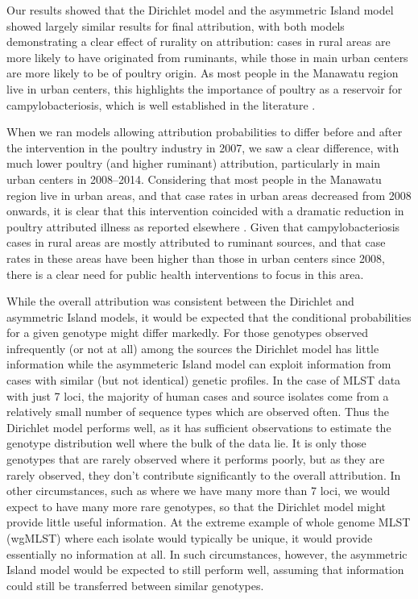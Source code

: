 \documentclass[AMA,STIX1COL]{WileyNJD-v2}
\begin{document}
Our results showed that the Dirichlet model and the asymmetric Island model showed largely similar results for final attribution, with both models demonstrating a clear effect of rurality on attribution: cases in rural areas are more likely to have originated from ruminants, while those in main urban centers are more likely to be of poultry origin. As most people in the Manawatu region live in urban centers, this highlights the importance of poultry as a reservoir for campylobacteriosis, which is well established in the literature \cite{MullA, Marsh, MullM, Leve}.

When we ran models allowing attribution probabilities to differ before and after the intervention in the poultry industry in 2007, we saw a clear difference, with much lower poultry (and higher ruminant) attribution, particularly in main urban centers in 2008--2014. Considering that most people in the Manawatu region live in urban areas, and that case rates in urban areas decreased from 2008 onwards, it is clear that this intervention coincided with a dramatic reduction in poultry attributed illness as reported elsewhere \cite{AnnS}. Given that campylobacteriosis cases in rural areas are mostly attributed to ruminant sources, and that case rates in these areas have been higher than those in urban centers since 2008, there is a clear need for public health interventions to focus in this area.

While the overall attribution was consistent between the Dirichlet and asymmetric Island models, it would be expected that the conditional probabilities for a given genotype might differ markedly. For those genotypes observed infrequently (or not at all) among the sources the Dirichlet model has little information while the asymmeteric Island model can exploit information from cases with similar (but not identical) genetic profiles. In the case of MLST data with just 7 loci, the majority of human cases and source isolates come from a relatively small number of sequence types which are observed often. Thus the Dirichlet model performs well, as it has sufficient observations to estimate the genotype distribution well where the bulk of the data lie. It is only those genotypes that are rarely observed where it performs poorly, but as they are rarely observed, they don't contribute significantly to the overall attribution. In other circumstances, such as where we have many more than 7 loci, we would expect to have many more rare genotypes, so that the Dirichlet model might provide little useful information. At the extreme example of whole genome MLST (wgMLST) where each isolate would typically be unique, it would provide essentially no information at all. In such circumstances, however, the asymmetric Island model would be expected to still perform well, assuming that information could still be transferred between similar genotypes.
\end{document}

